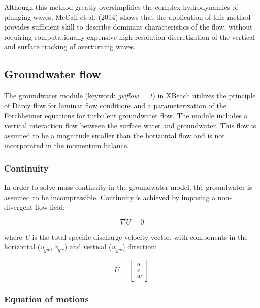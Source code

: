 \documentclass{article}
\begin{document}
\noindent 

\noindent Although this method greatly oversimplifies the complex hydrodynamics of plunging waves, McCall et al. (2014) shows that the application of this method provides sufficient skill to describe dominant characteristics of the flow, without requiring computationally expensive high-resolution discretization of the vertical and surface tracking of overturning waves. 


\subsection{ Groundwater flow}

\noindent The groundwater module (keyword: \textit{gwflow = 1}) in XBeach utilizes the principle of Darcy flow for laminar flow conditions and a parameterization of the Forchheimer equations for turbulent groundwater flow. The module includes a vertical interaction flow between the surface water and groundwater. This flow is assumed to be a magnitude smaller than the horizontal flow and is not incorporated in the momentum balance.


\subsubsection{ Continuity}

\noindent In order to solve mass continuity in the groundwater model, the groundwater is assumed to be incompressible. Continuity is achieved by imposing a non-divergent flow field:

\noindent 
\begin{equation} \label{ZEqnNum113258} 
\nabla U=0 
\end{equation} 


\noindent where \textit{U} is the total specific discharge velocity vector, with components in the horizontal (\textit{u${}_{gw}$}, \textit{v${}_{gw}$}) and vertical (\textit{w${}_{gw}$}) direction:

\noindent 
\begin{equation} \label{2.66)} 
U=\left[\begin{array}{c} {u} \\ {v} \\ {w} \end{array}\right] 
\end{equation} 



\subsubsection{ Equation of motions}
\end{document}
